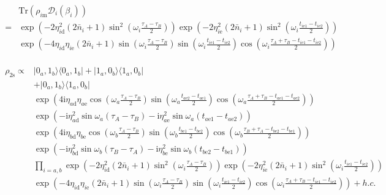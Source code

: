 \documentclass[10pt,fleqn]{article}
\newcommand{\ui}{\mathrm{i}}
\newcommand{\Tr}{\mathrm{Tr}}
\newcommand{\eqar}[1]
{
  \begin{align}
    #1
  \end{align}
}
\newcommand{\paren}[1]{{\left({#1}\right)}}
\begin{document}
\eqar{
  \begin{split}
    &\Tr\paren{\rho_{i\mathrm{m}}\mathcal{D}_i(\beta_i)}\\
    =&\exp\paren{-2\eta_{i\mathrm{d}}^2\paren{2\bar n_i+1}\sin^2\paren{\omega_i\frac{\tau_A-\tau_B}{2}}}\exp\paren{-2\eta_{i\mathrm{e}}^2\paren{2\bar n_i+1}\sin^2\paren{\omega_i\frac{t_{i\mathrm{e}1}-t_{i\mathrm{e}2}}{2}}}\\
    &\exp\paren{-4\eta_{i\mathrm{d}}\eta_{i\mathrm{e}}\paren{2\bar n_i+1}
      \sin\paren{\omega_i\frac{\tau_A-\tau_B}{2}}
      \sin\paren{\omega_i\frac{t_{i\mathrm{e}1}-t_{i\mathrm{e}2}}{2}}
      \cos\paren{\omega_i\frac{\tau_A+\tau_B-t_{i\mathrm{e}1}-t_{i\mathrm{e}2}}{2}}}
  \end{split}
}
\eqar{
  \begin{split}
    \rho_{2\mathrm{s}}\propto
    &|0_a,1_b\rangle\langle 0_a,1_b|+|1_a,0_b\rangle\langle 1_a,0_b|\\
    &+|0_a,1_b\rangle\langle 1_a,0_b|\\
    &\exp\paren{4\ui\eta_{a\mathrm{d}}\eta_{a\mathrm{e}}
      \cos\paren{\omega_a\frac{\tau_A-\tau_B}{2}}
      \sin\paren{\omega_a\frac{t_{a\mathrm{e}2}-t_{a\mathrm{e}1}}{2}}
      \cos\paren{\omega_a\frac{\tau_A+\tau_B-t_{a\mathrm{e}1}-t_{a\mathrm{e}2}}{2}}
      }\\
    &\exp\paren{
      -\ui\eta_{a\mathrm{d}}^2\sin\omega_a\paren{\tau_A-\tau_B}-\ui\eta_{a\mathrm{e}}^2\sin\omega_a\paren{t_{a\mathrm{e}1}-t_{a\mathrm{e}2}}
      }\\
    &\exp\paren{4\ui\eta_{b\mathrm{d}}\eta_{b\mathrm{e}}
      \cos\paren{\omega_b\frac{\tau_A-\tau_B}{2}}
      \sin\paren{\omega_b\frac{t_{b\mathrm{e}1}-t_{b\mathrm{e}2}}{2}}
      \cos\paren{\omega_b\frac{\tau_B+\tau_A-t_{b\mathrm{e}2}-t_{b\mathrm{e}1}}{2}}
      }\\
    &\exp\paren{
      -\ui\eta_{b\mathrm{d}}^2\sin\omega_b\paren{\tau_B-\tau_A}-\ui\eta_{b\mathrm{e}}^2\sin\omega_b\paren{t_{b\mathrm{e}2}-t_{b\mathrm{e}1}}
      }\\
    &\prod_{i=a,b}\exp\paren{-2\eta_{i\mathrm{d}}^2\paren{2\bar n_i+1}\sin^2\paren{\omega_i\frac{\tau_A-\tau_B}{2}}}\exp\paren{-2\eta_{i\mathrm{e}}^2\paren{2\bar n_i+1}\sin^2\paren{\omega_i\frac{t_{i\mathrm{e}1}-t_{i\mathrm{e}2}}{2}}}\\
    &\exp\paren{-4\eta_{i\mathrm{d}}\eta_{i\mathrm{e}}\paren{2\bar n_i+1}
      \sin\paren{\omega_i\frac{\tau_A-\tau_B}{2}}
      \sin\paren{\omega_i\frac{t_{i\mathrm{e}1}-t_{i\mathrm{e}2}}{2}}
      \cos\paren{\omega_i\frac{\tau_A+\tau_B-t_{i\mathrm{e}1}-t_{i\mathrm{e}2}}{2}}}+h.c.
  \end{split}
}
\end{document}
